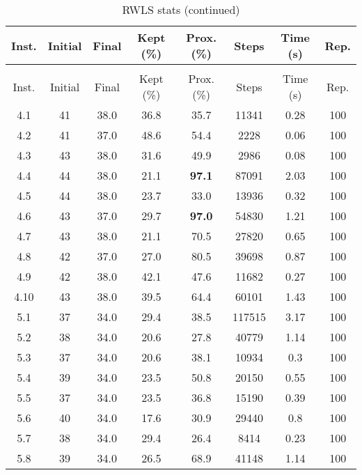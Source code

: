 \begin{longtable}{@{\extracolsep{5pt}}cccccccc}
	\caption{RWLS stats}\\
	\toprule
	Inst. & Initial & Final & Kept (\%) & Prox. (\%) & Steps & Time (s) & Rep.\\
	\midrule
	\endfirsthead
	\caption[]{RWLS stats (continued)}\\
	\toprule
	Inst. & Initial & Final & Kept (\%) & Prox. (\%) & Steps & Time (s) & Rep.\\
	\midrule
	\endhead
	\bottomrule
	\endfoot
	4.1 &
		41 & 38.0 &
			36.8
		&
			35.7
		& 11341 & 0.28 & 100
	\\
	4.2 &
		41 & 37.0 &
			48.6
		&
			54.4
		& 2228 & 0.06 & 100
	\\
	4.3 &
		43 & 38.0 &
			31.6
		&
			49.9
		& 2986 & 0.08 & 100
	\\
	4.4 &
		44 & 38.0 &
			21.1
		&
			\textbf{97.1}
		& 87091 & 2.03 & 100
	\\
	4.5 &
		44 & 38.0 &
			23.7
		&
			33.0
		& 13936 & 0.32 & 100
	\\
	4.6 &
		43 & 37.0 &
			29.7
		&
			\textbf{97.0}
		& 54830 & 1.21 & 100
	\\
	4.7 &
		43 & 38.0 &
			21.1
		&
			70.5
		& 27820 & 0.65 & 100
	\\
	4.8 &
		42 & 37.0 &
			27.0
		&
			80.5
		& 39698 & 0.87 & 100
	\\
	4.9 &
		42 & 38.0 &
			42.1
		&
			47.6
		& 11682 & 0.27 & 100
	\\
	4.10 &
		43 & 38.0 &
			39.5
		&
			64.4
		& 60101 & 1.43 & 100
	\\
	5.1 &
		37 & 34.0 &
			29.4
		&
			38.5
		& 117515 & 3.17 & 100
	\\
	5.2 &
		38 & 34.0 &
			20.6
		&
			27.8
		& 40779 & 1.14 & 100
	\\
	5.3 &
		37 & 34.0 &
			20.6
		&
			38.1
		& 10934 & 0.3 & 100
	\\
	5.4 &
		39 & 34.0 &
			23.5
		&
			50.8
		& 20150 & 0.55 & 100
	\\
	5.5 &
		37 & 34.0 &
			23.5
		&
			36.8
		& 15190 & 0.39 & 100
	\\
	5.6 &
		40 & 34.0 &
			17.6
		&
			30.9
		& 29440 & 0.8 & 100
	\\
	5.7 &
		38 & 34.0 &
			29.4
		&
			26.4
		& 8414 & 0.23 & 100
	\\
	5.8 &
		39 & 34.0 &
			26.5
		&
			68.9
		& 41148 & 1.14 & 100
	\\

\end{longtable}
